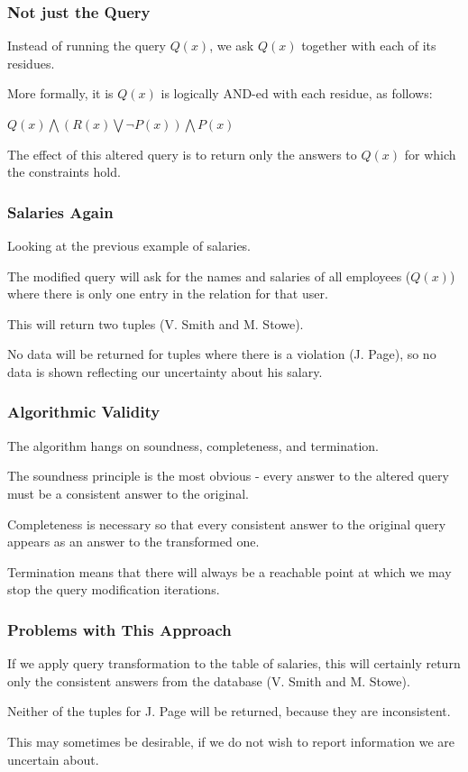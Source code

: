 \begin{frame}
\frametitle{Not just the Query}

Instead of running the query $Q(x)$, we ask $Q(x)$ together with each of its residues. 

More formally, it is $Q(x)$ is logically AND-ed with each residue, as follows:

\begin{center}
$Q(x) \bigwedge (R(x) \bigvee \neg P(x)) \bigwedge P(x)$
\end{center}

The effect of this altered query is to return only the answers to $Q(x)$ for which the constraints hold.

\end{frame}


\begin{frame}
\frametitle{Salaries Again}

Looking at the previous example of salaries.

The modified query will ask for the names and salaries of all employees ($Q(x)$) where there is only one entry in the relation for that user.

This will return two tuples (V. Smith and M. Stowe). 

No data will be returned for tuples where there is a violation (J. Page), so no data is shown reflecting our uncertainty about his salary.


\end{frame}

\begin{frame}
\frametitle{Algorithmic Validity}

The algorithm hangs on soundness, completeness, and termination.

The soundness principle is the most obvious - every answer to the altered query must be a consistent answer to the original.

Completeness is necessary so that every consistent answer to the original query appears as an answer to the transformed one. 

Termination means that there will always be a reachable point at which we may stop the query modification iterations.

\end{frame}



\begin{frame}
\frametitle{Problems with This Approach}

If we apply query transformation to the table of salaries, this will certainly return only the consistent answers from the database (V. Smith and M. Stowe). 

Neither of the tuples for J. Page will be returned, because they are inconsistent. 

This may sometimes be desirable, if we do not wish to report information we are uncertain about. 

\end{frame}



